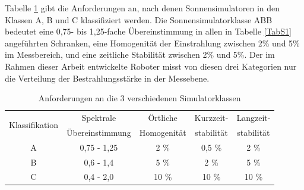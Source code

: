 \documentclass[a4paper,bibtotoc,oneside]{scrbook}
\begin{document}
\noindent Tabelle \ref{TabS2} gibt die Anforderungen an, nach denen Sonnensimulatoren in den Klassen A, B und C klassifiziert werden. Die Sonnensimulatorklasse ABB bedeutet eine 0,75- bis 1,25-fache Übereinstimmung in allen in Tabelle \ref{TabS1} angeführten Schranken, eine Homogenität der Einstrahlung zwischen 2\% und 5\% im Messbereich, und eine zeitliche Stabilität zwischen 2\% und 5\%. Der im Rahmen dieser Arbeit entwickelte Roboter misst von diesen drei Kategorien nur die Verteilung der Bestrahlungsstärke in der Messebene.
\begin{table}[htbp]
\centering
\begin{tabular}{ | c | c | c | c | c |}\hline
\multirow{2}{*}{Klassifikation} &  Spektrale  &  Örtliche  & {Kurzzeit-}& {Langzeit-}\\
& Übereinstimmung & Homogenität & {stabilität} & {stabilität} \\ 
\hline
\hline
A  & 0,75 - 1,25 & 2 \% & 0,5 \% & 2 \%\\ \hline
B  & 0,6 - 1,4 & 5 \% & 2 \% & 5 \%\\ \hline
C  & 0,4 - 2,0 & 10 \% & 10 \% & 10 \%\\ \hline
\end{tabular}
\caption{Anforderungen an die 3 verschiedenen Simulatorklassen}\label{TabS2}
\end{table}
\end{document}
